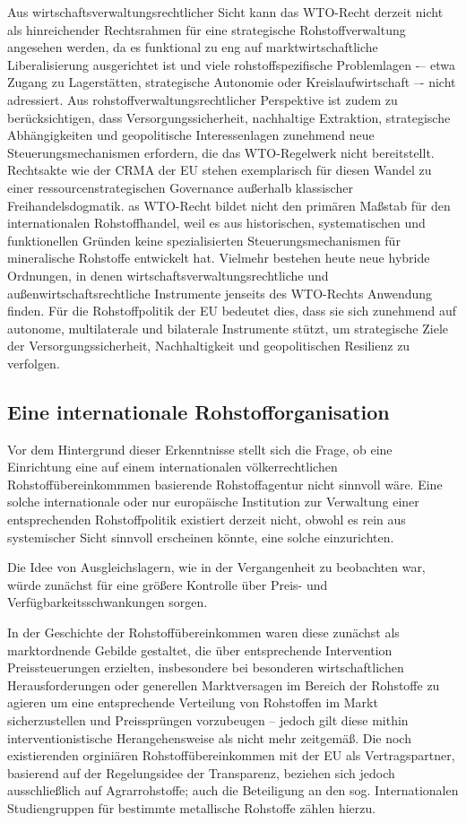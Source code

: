 \documentclass[12pt,a4paper,oneside]{book} %
\begin{document}
{Aus wirtschaftsverwaltungsrechtlicher Sicht kann das WTO-Recht derzeit nicht als hinreichender Rechtsrahmen für eine strategische Rohstoffverwaltung angesehen werden, da es funktional zu eng auf marktwirtschaftliche Liberalisierung ausgerichtet ist und viele rohstoffspezifische Problemlagen -– etwa Zugang zu Lagerstätten, strategische Autonomie oder Kreislaufwirtschaft –- nicht adressiert. Aus rohstoffverwaltungsrechtlicher Perspektive ist zudem zu berücksichtigen, dass Versorgungssicherheit, nachhaltige Extraktion, strategische Abhängigkeiten und geopolitische Interessenlagen zunehmend neue Steuerungsmechanismen erfordern, die das WTO-Regelwerk nicht bereitstellt. Rechtsakte wie der CRMA der EU stehen exemplarisch für diesen Wandel zu einer ressourcenstrategischen Governance außerhalb klassischer Freihandelsdogmatik. as WTO-Recht bildet nicht den primären Maßstab für den internationalen Rohstoffhandel, weil es aus historischen, systematischen und funktionellen Gründen keine spezialisierten Steuerungsmechanismen für mineralische Rohstoffe entwickelt hat. Vielmehr bestehen heute neue hybride Ordnungen, in denen wirtschaftsverwaltungsrechtliche und außenwirtschaftsrechtliche Instrumente jenseits des WTO-Rechts Anwendung finden. Für die Rohstoffpolitik der EU bedeutet dies, dass sie sich zunehmend auf autonome, multilaterale und bilaterale Instrumente stützt, um strategische Ziele der Versorgungssicherheit, Nachhaltigkeit und geopolitischen Resilienz zu verfolgen.

\subsection{Eine internationale Rohstofforganisation}
Vor dem Hintergrund dieser Erkenntnisse stellt sich die Frage, ob eine Einrichtung eine auf einem internationalen völkerrechtlichen Rohstoffübereinkommmen basierende Rohstoffagentur nicht sinnvoll wäre. Eine solche internationale oder nur europäische Institution zur Verwaltung einer entsprechenden Rohstoffpolitik existiert derzeit nicht, obwohl es rein aus systemischer Sicht sinnvoll erscheinen könnte, eine solche einzurichten.

Die Idee von Ausgleichslagern, wie in der Vergangenheit zu beobachten war, würde zunächst für eine größere Kontrolle über Preis- und Verfügbarkeitsschwankungen sorgen.

In der Geschichte der Rohstoffübereinkommen waren diese zunächst als marktordnende Gebilde gestaltet, die über entsprechende Intervention Preissteuerungen erzielten, insbesondere bei besonderen wirtschaftlichen Herausforderungen oder generellen Marktversagen im Bereich der Rohstoffe zu agieren um eine entsprechende Verteilung von Rohstoffen im Markt sicherzustellen und Preissprüngen vorzubeugen -- jedoch gilt diese mithin interventionistische Herangehensweise als nicht mehr zeitgemäß.\autocite[Und dazu auch widerlegt; siehe ausführlich]{Schorkopf, Rn. 43} Die noch existierenden orginiären Rohstoffübereinkommen mit der EU als Vertragspartner, basierend auf der Regelungsidee der Transparenz, beziehen sich jedoch ausschließlich auf Agrarrohstoffe; auch die Beteiligung an den sog. Internationalen Studiengruppen für bestimmte metallische Rohstoffe zählen hierzu.\autocite{Schorkopf, Rn. 44, 45}

}
\end{document}
